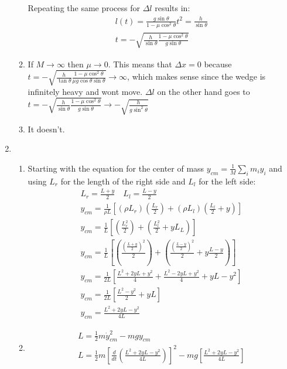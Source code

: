 \documentclass[12pt]{article}
\newcommand{\der}[2]{\frac{d #1}{d #2}}
\begin{document}
\begin{enumerate}
\begin{enumerate}
      Repeating the same process for $\Delta l$ results in:
      \begin{gather}
        l(t)=\frac{g\sin\theta}{1-\mu\cos^2\theta}t^2=\frac{h}{\sin\theta}\\
        t=-\sqrt{\frac{h}{\sin\theta}\frac{1-\mu\cos^2\theta}{g\sin\theta}}
      \end{gather}
      \item
      If $M\rightarrow\infty$ then $\mu\rightarrow0$.
      This means that  $\Delta x=0$ because $t=-\sqrt{\frac{h}{\tan\theta}\frac{ 1-\mu\cos^2\theta}{\mu g\cos\theta\sin\theta}}\rightarrow\infty$, which makes sense since the wedge is infinitely heavy and wont move.
      $\Delta l$ on the other hand goes to $t=-\sqrt{\frac{h}{\sin\theta}\frac{1-\mu\cos^2\theta}{g\sin\theta}}\rightarrow-\sqrt{\frac{h}{g\sin^2\theta}}$
      \item It doesn't.
    \end{enumerate}
    \item
    \begin{enumerate}
      \item
      Starting with the equation for the center of mass $y_{cm}=\frac{1}{M}\sum_i m_i y_i$ and using $L_r$ for the length of the right side and $L_l$ for the left side:
      \begin{gather}
        L_r=\frac{L+y}{2}\quad L_l=\frac{L-y}{2}\\
        y_{cm}=\frac{1}{\rho L}\left[ (\rho L_r)\left(\frac{L_r}{2}\right) +(\rho L_l)\left(\frac{L_l}{2}+y\right) \right]\\
        y_{cm}=\frac{1}{L}\left[ \left(\frac{L_r^2}{2}\right) +\left(\frac{L_l^2}{2}+yL_L\right) \right]\\
        y_{cm}=\frac{1}{L}\left[ \left(\frac{\left(\frac{L+y}{2}\right)^2}{2}\right) +\left(\frac{\left( \frac{L-y}{2} \right)^2}{2}+y\frac{L-y}{2}\right) \right]\\
        y_{cm}=\frac{1}{2L}\left[ \frac{L^2+2yL+y^2}{4} +\frac{L^2-2yL+y^2}{4}+yL-y^2\right]\\
        y_{cm}=\frac{1}{2L}\left[ \frac{L^2-y^2}{2}+yL\right]\\
        y_{cm}=\frac{L^2+2yL-y^2}{4L}
      \end{gather}
      \item
      \begin{gather}
        L=\frac{1}{2}m\dot{y}_{cm}^2-mgy_{cm}\\
        L=\frac{1}{2}m\left[\der{}{t}\left( \frac{L^2+2yL-y^2}{4L} \right)\right]^2-mg\left[ \frac{L^2+2yL-y^2}{4L}\right]\\

\end{gather}
\end{enumerate}
\end{enumerate}
\end{document}
